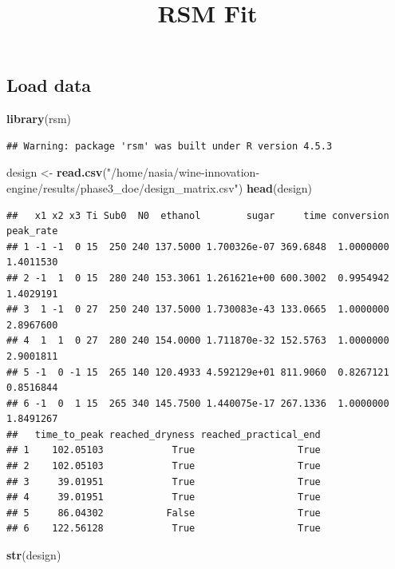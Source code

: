 \documentclass[
]{article}
\title{RSM Fit}
\author{}
\date{\vspace{-2.5em}}
\newenvironment{Shaded}{\begin{snugshade}}{\end{snugshade}}
\newcommand{\FunctionTok}[1]{\textcolor[rgb]{0.13,0.29,0.53}{\textbf{#1}}}
\newcommand{\NormalTok}[1]{#1}
\newcommand{\OtherTok}[1]{\textcolor[rgb]{0.56,0.35,0.01}{#1}}
\newcommand{\StringTok}[1]{\textcolor[rgb]{0.31,0.60,0.02}{#1}}
\begin{document}
\maketitle

\subsection{Load data}\label{load-data}

\begin{Shaded}
\begin{Highlighting}[]
\FunctionTok{library}\NormalTok{(rsm)}
\end{Highlighting}
\end{Shaded}

\begin{verbatim}
## Warning: package 'rsm' was built under R version 4.5.3
\end{verbatim}

\begin{Shaded}
\begin{Highlighting}[]
\NormalTok{design }\OtherTok{\textless{}{-}} \FunctionTok{read.csv}\NormalTok{(}\StringTok{"/home/nasia/wine{-}innovation{-}engine/results/phase3\_doe/design\_matrix.csv"}\NormalTok{)}
\FunctionTok{head}\NormalTok{(design)}
\end{Highlighting}
\end{Shaded}

\begin{verbatim}
##   x1 x2 x3 Ti Sub0  N0  ethanol        sugar     time conversion peak_rate
## 1 -1 -1  0 15  250 240 137.5000 1.700326e-07 369.6848  1.0000000 1.4011530
## 2 -1  1  0 15  280 240 153.3061 1.261621e+00 600.3002  0.9954942 1.4029191
## 3  1 -1  0 27  250 240 137.5000 1.730083e-43 133.0665  1.0000000 2.8967600
## 4  1  1  0 27  280 240 154.0000 1.711870e-32 152.5763  1.0000000 2.9001811
## 5 -1  0 -1 15  265 140 120.4933 4.592129e+01 811.9060  0.8267121 0.8516844
## 6 -1  0  1 15  265 340 145.7500 1.440075e-17 267.1336  1.0000000 1.8491267
##   time_to_peak reached_dryness reached_practical_end
## 1    102.05103            True                  True
## 2    102.05103            True                  True
## 3     39.01951            True                  True
## 4     39.01951            True                  True
## 5     86.04302           False                  True
## 6    122.56128            True                  True
\end{verbatim}

\begin{Shaded}
\begin{Highlighting}[]
\FunctionTok{str}\NormalTok{(design)}
\end{Highlighting}
\end{Shaded}
\end{document}
